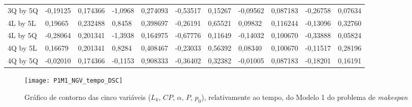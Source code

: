\begin{table}[]
{\begin{tabular}{lllllllllll}
\rowcolor[HTML]{FFFFFF} 
3Q by 5Q                              & {\color[HTML]{181A1B} -0,19125} & {\color[HTML]{181A1B} 0,174366} & {\color[HTML]{181A1B} -1,0968}  & {\color[HTML]{181A1B} 0,274093} & {\color[HTML]{181A1B} -0,53517}       & {\color[HTML]{181A1B} 0,15267}        & {\color[HTML]{181A1B} -0,09562} & {\color[HTML]{181A1B} 0,087183}      & {\color[HTML]{181A1B} -0,26758}       & {\color[HTML]{181A1B} 0,07634}        \\
\rowcolor[HTML]{FFFFFF} 
4L by 5L                              & {\color[HTML]{181A1B} 0,19665}  & {\color[HTML]{181A1B} 0,232488} & {\color[HTML]{181A1B} 0,8458}   & {\color[HTML]{181A1B} 0,398697} & {\color[HTML]{181A1B} -0,26191}       & {\color[HTML]{181A1B} 0,65521}        & {\color[HTML]{181A1B} 0,09832}  & {\color[HTML]{181A1B} 0,116244}      & {\color[HTML]{181A1B} -0,13096}       & {\color[HTML]{181A1B} 0,32760}        \\
\rowcolor[HTML]{FFFFFF} 
4L by 5Q                              & {\color[HTML]{181A1B} -0,28064} & {\color[HTML]{181A1B} 0,201341} & {\color[HTML]{181A1B} -1,3938}  & {\color[HTML]{181A1B} 0,164975} & {\color[HTML]{181A1B} -0,67776}       & {\color[HTML]{181A1B} 0,11649}        & {\color[HTML]{181A1B} -0,14032} & {\color[HTML]{181A1B} 0,100670}      & {\color[HTML]{181A1B} -0,33888}       & {\color[HTML]{181A1B} 0,05824}        \\
\rowcolor[HTML]{FFFFFF} 
4Q by 5L                              & {\color[HTML]{181A1B} 0,16679}  & {\color[HTML]{181A1B} 0,201341} & {\color[HTML]{181A1B} 0,8284}   & {\color[HTML]{181A1B} 0,408467} & {\color[HTML]{181A1B} -0,23033}       & {\color[HTML]{181A1B} 0,56392}        & {\color[HTML]{181A1B} 0,08340}  & {\color[HTML]{181A1B} 0,100670}      & {\color[HTML]{181A1B} -0,11517}       & {\color[HTML]{181A1B} 0,28196}        \\
\rowcolor[HTML]{FFFFFF} 
4Q by 5Q                              & {\color[HTML]{181A1B} -0,02010} & {\color[HTML]{181A1B} 0,174366} & {\color[HTML]{181A1B} -0,1153}  & {\color[HTML]{181A1B} 0,908333} & {\color[HTML]{181A1B} -0,36402}       & {\color[HTML]{181A1B} 0,32382}        & {\color[HTML]{181A1B} -0,01005} & {\color[HTML]{181A1B} 0,087183}      & {\color[HTML]{181A1B} -0,18201}       & {\color[HTML]{181A1B} 0,16191}       
\end{tabular}
}
\end{table}

\begin{figure}[H]
\caption{Gráfico de contorno das cinco variáveis ($L_{k}$, $CP$, $\alpha$, $P$, $p_{0}$), relativamente ao tempo, do Modelo 1 do problema de \textit{makespan}}
\centering
\texttt{[image: P1M1\_NGV\_tempo\_DSC]}
\end{figure}



